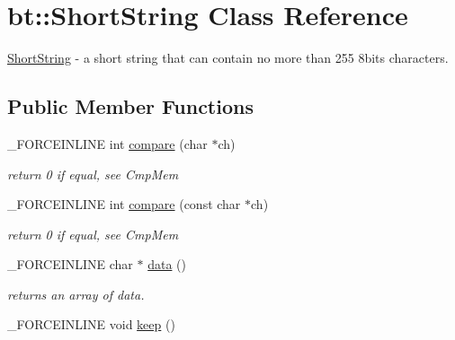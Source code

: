 \hypertarget{classbt_1_1_short_string}{\section{bt\-:\-:Short\-String Class Reference}
\label{classbt_1_1_short_string}
}


\hyperlink{classbt_1_1_short_string}{Short\-String} -\/ a short string that can contain no more than 255 8bits characters.  


\subsection*{Public Member Functions}
\begin{DoxyCompactItemize}
\item 
\hypertarget{classbt_1_1_short_string_a412f2e92532daaf6f8263c8e993237c6}{\-\_\-\-F\-O\-R\-C\-E\-I\-N\-L\-I\-N\-E int \hyperlink{classbt_1_1_short_string_a412f2e92532daaf6f8263c8e993237c6}{compare} (char $\ast$ch)}\label{classbt_1_1_short_string_a412f2e92532daaf6f8263c8e993237c6}

\begin{DoxyCompactList}\small\item\em return 0 if equal, see Cmp\-Mem \end{DoxyCompactList}\item 
\hypertarget{classbt_1_1_short_string_ab2f06b8d92b18d6f94f8784b637bbcd4}{\-\_\-\-F\-O\-R\-C\-E\-I\-N\-L\-I\-N\-E int \hyperlink{classbt_1_1_short_string_ab2f06b8d92b18d6f94f8784b637bbcd4}{compare} (const char $\ast$ch)}\label{classbt_1_1_short_string_ab2f06b8d92b18d6f94f8784b637bbcd4}

\begin{DoxyCompactList}\small\item\em return 0 if equal, see Cmp\-Mem \end{DoxyCompactList}\item 
\hypertarget{classbt_1_1_short_string_a37fa0549f63856f35efbcdfc0e2035f8}{\-\_\-\-F\-O\-R\-C\-E\-I\-N\-L\-I\-N\-E char $\ast$ \hyperlink{classbt_1_1_short_string_a37fa0549f63856f35efbcdfc0e2035f8}{data} ()}\label{classbt_1_1_short_string_a37fa0549f63856f35efbcdfc0e2035f8}

\begin{DoxyCompactList}\small\item\em returns an array of data. \end{DoxyCompactList}\item 
\hypertarget{classbt_1_1_short_string_a9b89d63fbf3246246b6b07b611889e76}{\-\_\-\-F\-O\-R\-C\-E\-I\-N\-L\-I\-N\-E void \hyperlink{classbt_1_1_short_string_a9b89d63fbf3246246b6b07b611889e76}{keep} ()}\label{classbt_1_1_short_string_a9b89d63fbf3246246b6b07b611889e76}


\end{DoxyCompactItemize}
